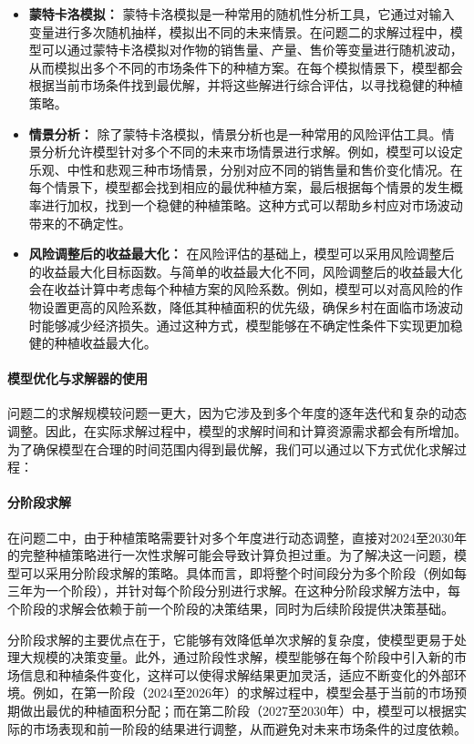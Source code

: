 \documentclass[12pt,a4paper]{nmmcm}
\begin{document}
\begin{itemize}
    \item \textbf{蒙特卡洛模拟：} 蒙特卡洛模拟是一种常用的随机性分析工具，它通过对输入变量进行多次随机抽样，模拟出不同的未来情景。在问题二的求解过程中，模型可以通过蒙特卡洛模拟对作物的销售量、产量、售价等变量进行随机波动，从而模拟出多个不同的市场条件下的种植方案。在每个模拟情景下，模型都会根据当前市场条件找到最优解，并将这些解进行综合评估，以寻找稳健的种植策略。
    
    \item \textbf{情景分析：} 除了蒙特卡洛模拟，情景分析也是一种常用的风险评估工具。情景分析允许模型针对多个不同的未来市场情景进行求解。例如，模型可以设定乐观、中性和悲观三种市场情景，分别对应不同的销售量和售价变化情况。在每个情景下，模型都会找到相应的最优种植方案，最后根据每个情景的发生概率进行加权，找到一个稳健的种植策略。这种方式可以帮助乡村应对市场波动带来的不确定性。

    \item \textbf{风险调整后的收益最大化：} 在风险评估的基础上，模型可以采用风险调整后的收益最大化目标函数。与简单的收益最大化不同，风险调整后的收益最大化会在收益计算中考虑每个种植方案的风险系数。例如，模型可以对高风险的作物设置更高的风险系数，降低其种植面积的优先级，确保乡村在面临市场波动时能够减少经济损失。通过这种方式，模型能够在不确定性条件下实现更加稳健的种植收益最大化。
\end{itemize}

\paragraph{模型优化与求解器的使用}

问题二的求解规模较问题一更大，因为它涉及到多个年度的逐年迭代和复杂的动态调整。因此，在实际求解过程中，模型的求解时间和计算资源需求都会有所增加。为了确保模型在合理的时间范围内得到最优解，我们可以通过以下方式优化求解过程：

\paragraph{分阶段求解}

在问题二中，由于种植策略需要针对多个年度进行动态调整，直接对2024至2030年的完整种植策略进行一次性求解可能会导致计算负担过重。为了解决这一问题，模型可以采用分阶段求解的策略。具体而言，即将整个时间段分为多个阶段（例如每三年为一个阶段），并针对每个阶段分别进行求解。在这种分阶段求解方法中，每个阶段的求解会依赖于前一个阶段的决策结果，同时为后续阶段提供决策基础。

分阶段求解的主要优点在于，它能够有效降低单次求解的复杂度，使模型更易于处理大规模的决策变量。此外，通过阶段性求解，模型能够在每个阶段中引入新的市场信息和种植条件变化，这样可以使得求解结果更加灵活，适应不断变化的外部环境。例如，在第一阶段（2024至2026年）的求解过程中，模型会基于当前的市场预期做出最优的种植面积分配；而在第二阶段（2027至2030年）中，模型可以根据实际的市场表现和前一阶段的结果进行调整，从而避免对未来市场条件的过度依赖。
\end{document}
